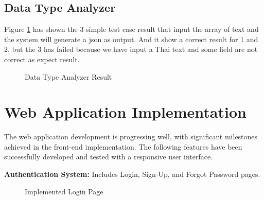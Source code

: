 \documentclass[12pt,oneside,openright,a4paper]{cpe-english-project}
\begin{document}
\subsection{Data Type Analyzer}
Figure \ref{fig:datatype-result} has shown the 3 simple test case result that input the array of text and the system will generate a json as output. And it show a correct result for 1 and 2, but the 3 has failed because we have input a Thai text and some field are not correct as expect result.

\begin{figure}[H]
\centering
{}
\caption{Data Type Analyzer Result}\label{fig:datatype-result}
\end{figure}


\section{Web Application Implementation}

The web application development is progressing well, with significant milestones achieved in the front-end implementation. The following features have been successfully developed and tested with a responsive user interface.

\textbf{Authentication System:} Includes Login, Sign-Up, and Forgot Password pages.

\begin{figure}[H]
\centering
{}
\caption{Implemented Login Page}\label{fig:auth-login}
\end{figure}
\end{document}
